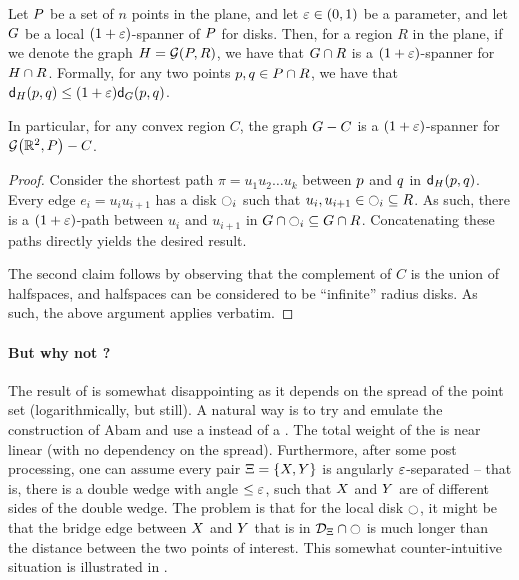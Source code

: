 \documentclass[12pt]{article}%
\begin{document}
\begin{corollary}
    Let $P$ be a set of $n$ points in the plane, and let
    $\varepsilon \in (0,1)$ be a parameter, and let $G$ be a local
    $(1+\varepsilon)$-spanner of $P$ for disks. Then, for a region $R$ in
    the plane, if we denote the graph $\GA = \GY{\PS}{R}$, we have
    that $G \cap {R}$ is a $(1+\varepsilon)$-spanner for
    $H \cap {R}$. Formally, for any two points
    $p, q \in P \cap R$, we have that
    $\dGZ{\GA}{\pa}{\pb} \leq (1+\eps)\dGZ{\G}{\pa}{\pb}$.

    In particular, for any convex region $C$, the graph $G - C$
    is a $(1+\varepsilon)$-spanner for $\GY{\Re^2}{\PS} \gminus C$.
\end{corollary}
\begin{proof}
    Consider the shortest path $\pi = u_1 u_2 \ldots u_k$ between
    $p$ and $q$ in $\dGZ{\GA}{\pa}{\pb}$. Every edge
    $e_i = u_i u_{i+1}$ has a disk $\ocircle_i$ such that
    $u_i, u_{i+1} \in \ocircle_i \subseteq R$. As such, there is a
    $(1+\varepsilon)$-path between $u_i$ and $u_{i+1}$ in
    $G \cap {\ocircle_i} \subseteq
    G \cap {R}$. Concatenating these paths directly yields the
    desired result.

    The second claim follows by observing that the complement of $C$
    is the union of halfspaces, and halfspaces can be considered to be
    ``infinite'' radius disks. As such, the above argument applies
    verbatim.
\end{proof}

\paragraph{But why not \SSPD?}

The result of  is somewhat disappointing as it depends
on the spread of the point set (logarithmically, but still). A natural
way is to try and emulate the construction of Abam \etal
\cite{abfg-rftgs-09} and use a \SSPD instead of a \WSPD. The total
weight of the \SSPD is near linear (with no dependency on the
spread). Furthermore, after some post processing, one can assume every
pair $\Xi = \{ X, Y \}$ is angularly $\varepsilon$-separated -- that
is, there is a double wedge with angle $\leq \varepsilon$, such that $X$
and $Y$ are of different sides of the double wedge. The problem is
that for the local disk $\ocircle$, it might be that the bridge edge
between $X$ and $Y$ that is in $\mathcal{D}_\Xi \cap \ocircle$ is much
longer than the distance between the two points of interest. This
somewhat counter-intuitive situation is illustrated in .
\end{document}
